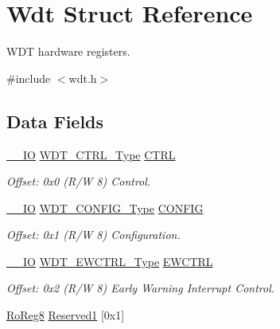 \hypertarget{struct_wdt}{}\section{Wdt Struct Reference}
\label{struct_wdt}


W\+DT hardware registers.  




{\ttfamily \#include $<$wdt.\+h$>$}

\subsection*{Data Fields}
\begin{DoxyCompactItemize}
\item 
\mbox{\hyperlink{core__cm0plus_8h_aec43007d9998a0a0e01faede4133d6be}{\+\_\+\+\_\+\+IO}} \mbox{\hyperlink{union_w_d_t___c_t_r_l___type}{W\+D\+T\+\_\+\+C\+T\+R\+L\+\_\+\+Type}} \mbox{\hyperlink{struct_wdt_abcd6721909c6064d79fc516be6d584b7}{C\+T\+RL}}
\begin{DoxyCompactList}\small\item\em Offset\+: 0x0 (R/W 8) Control. \end{DoxyCompactList}\item 
\mbox{\hyperlink{core__cm0plus_8h_aec43007d9998a0a0e01faede4133d6be}{\+\_\+\+\_\+\+IO}} \mbox{\hyperlink{union_w_d_t___c_o_n_f_i_g___type}{W\+D\+T\+\_\+\+C\+O\+N\+F\+I\+G\+\_\+\+Type}} \mbox{\hyperlink{struct_wdt_a06e276b8f30dca80ed9422ef08622536}{C\+O\+N\+F\+IG}}
\begin{DoxyCompactList}\small\item\em Offset\+: 0x1 (R/W 8) Configuration. \end{DoxyCompactList}\item 
\mbox{\hyperlink{core__cm0plus_8h_aec43007d9998a0a0e01faede4133d6be}{\+\_\+\+\_\+\+IO}} \mbox{\hyperlink{union_w_d_t___e_w_c_t_r_l___type}{W\+D\+T\+\_\+\+E\+W\+C\+T\+R\+L\+\_\+\+Type}} \mbox{\hyperlink{struct_wdt_a96a0bb45f2388fc6947af86c7aebce25}{E\+W\+C\+T\+RL}}
\begin{DoxyCompactList}\small\item\em Offset\+: 0x2 (R/W 8) Early Warning Interrupt Control. \end{DoxyCompactList}\item 
\mbox{\hyperlink{group___s_a_m_d21_e15_a__definitions_ga0d957f1433aaf5d70e4dc2b68288442d}{Ro\+Reg8}} \mbox{\hyperlink{struct_wdt_a092866123ac46d0985136e4dca2f36f4}{Reserved1}} \mbox{[}0x1\mbox{]}
\item 

\end{DoxyCompactItemize}
